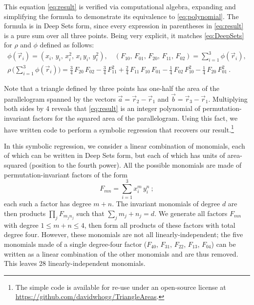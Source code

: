 \documentclass[10pt]{article}
\begin{document}
This equation \eqref{eq:result} is verified via computational algebra, expanding and simplifying the formula to demonstrate its equivalence to \eqref{eq:polynomial}.
The formula is in Deep Sets form, since
every expression in parentheses in \eqref{eq:result} is a pure sum over all three points.
Being very explicit, it matches \eqref{eq:DeepSets} for $\rho$ and $\phi$ defined as follows:
\begin{gather}
    \phi(\vec{r}_i) = (
        x_i, \,
        y_i, \,
        x_i^2, \,
        x_i \, y_i, \,
        y_i^2
    ), \quad
    (
        F_{10}, \,
        F_{01}, \,
        F_{20}, \,
        F_{11}, \,
        F_{02}
    ) = \sum_{i=1}^{3} \phi(\vec{r}_i),
    \\
    \rho \, \big( \sum_{i=1}^{3} \phi(\vec{r}_i) \big)
    = \frac{3}{4} \, F_{20} \, F_{02}
    - \frac{3}{4} \, F_{11}^2
    + \frac{2}{4} \, F_{11} \, F_{10} \, F_{01}
    - \frac{1}{4} \, F_{02} \, F_{10}^2
    - \frac{1}{4} \, F_{20} \, F_{01}^2~.
    \nonumber
\end{gather}

Note that a triangle defined by three points has one-half the area of the parallelogram spanned by the vectors $\vec{a} = \vec{r}_2 - \vec{r}_1$ and $\vec{b} = \vec{r}_3 - \vec{r}_1$.
Multiplying both sides by 4 reveals that \eqref{eq:result} is an integer polynomial of permutation-invariant factors for the squared area of the parallelogram.
Using this fact, we have written code to perform a symbolic regression that recovers our result.\footnote{
    The simple code is available for re-use under an open-source license at \url{https://github.com/davidwhogg/TriangleAreas}.
}

In this symbolic regression, we consider a linear combination of monomials, each of which can be written in Deep Sets form, but each of which has units of area-squared (position to the fourth power).
All the possible monomials are made of permutation-invariant factors of the form 
\begin{equation}
F_{mn} = \sum_{i=1}^{3} x_i^m \, y_i^n~;
\end{equation}
each such a factor has degree $m + n$.
The invariant monomials of degree $d$ are then products $\prod_j F_{m_j n_j}$ such that $\sum_j m_j + n_j = d$.
We generate all factors $F_{mn}$ with degree $1 \leq m + n \leq 4$, then form all products of these factors with total degree four.
However, these monomials are not all linearly-independent;
the five monomials made of a single degree-four factor ($F_{40}$, $F_{31}$, $F_{22}$, $F_{13}$, $F_{04}$) can be written as a linear combination of the other monomials and are thus removed.
This leaves 28 linearly-independent monomials.
\end{document}
